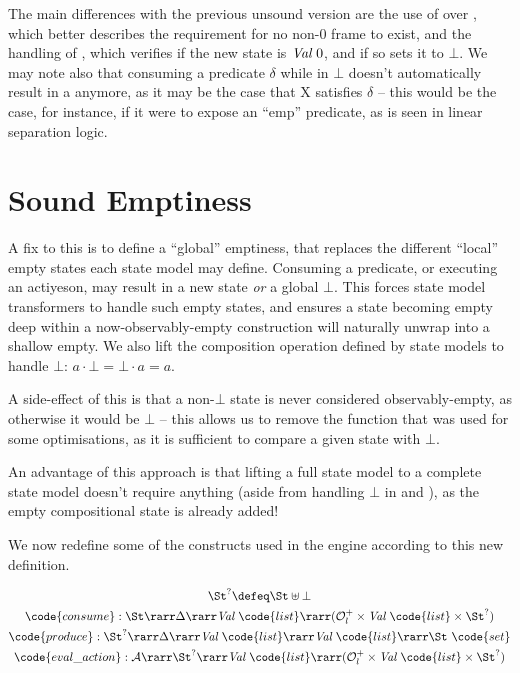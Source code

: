 The main differences with the previous unsound version are the use of \isexowned over , which better describes the requirement for no non-0 frame to exist, and the handling of , which verifies if the new state is $\textit{Val}~0$, and if so sets it to $\bot$. We may note also that consuming a predicate $\delta$ while in $\bot$ doesn't automatically result in a \Miss anymore, as it may be the case that X satisfies $\delta$ -- this would be the case, for instance, if it were to expose an ``emp'' predicate, as is seen in linear separation logic.

\section{Sound Emptiness}

A fix to this is to define a ``global'' emptiness, that replaces the different ``local'' empty states each state model may define. Consuming a predicate, or executing an actiyeson, may result in a new state {\it or} a global $\bot$. This forces state model transformers to handle such empty states, and ensures a state becoming empty deep within a now-observably-empty construction will naturally unwrap into a shallow empty. We also lift the composition operation defined by state models to handle $\bot$: $a \cdot \bot = \bot \cdot a = a$.

A side-effect of this is that a non-$\bot$ state is never considered observably-empty, as otherwise it would be $\bot$ -- this allows us to remove the  function that was used for some optimisations, as it is sufficient to compare a given state with $\bot$.

An advantage of this approach is that lifting a full state model to a complete state model doesn't require anything (aside from handling $\bot$ in  and ), as the empty compositional state is already added!

We now redefine some of the constructs used in the engine according to this new definition.

\newcommand{\vallist}[0]{\textit{Val}~\code{list}}


\begin{gather*}
	\St^? \defeq \St \uplus \bot\\
	\code{consume}:\St \rarr \Delta \rarr \vallist \rarr (\mathcal O^+_l \times \vallist \times \St^?) \\
	\code{produce}:\St^? \rarr \Delta \rarr \vallist \rarr \vallist \rarr \St~\code{set}\\
	\code{eval\_action}: {\cal A} \rarr \St^? \rarr \vallist \rarr (\mathcal O^+_l \times \vallist \times \St^?)
\end{gather*}

